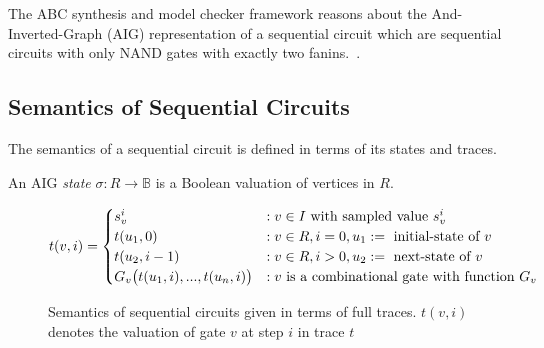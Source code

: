 The ABC synthesis and model checker framework reasons about 
the And-Inverted-Graph (AIG) representation of a sequential 
circuit which are sequential circuits with only NAND gates 
with exactly two fanins.~\cite{brayton2010abc}. 

\subsection{Semantics of Sequential Circuits}
\label{s:back:crct_semantics}
%
The semantics of a sequential circuit is defined in terms of its states and traces.
%
\begin{definition}
An AIG \emph{state} $\sigma: R \rightarrow \mathbb{B}$ is a Boolean valuation of vertices in $R$. 
\end{definition}
%


%
\begin{figure*}
\[
t(v,i)=
   \begin{cases}
      s^i_{v}            &:v \in I \ \text{with sampled value $s_{v}^i$}\\
      t(u_1, 0)       &:v \in R,i=0,u_1:=\ \text{initial-state of $v$}\\
      t(u_2, i-1)        &:v \in R,i>0,u_2:=\ \text{next-state of $v$}\\
      G_v\big(t(u_{1},i),...,t(u_{n},i)\big) &: v \ \text{is a combinational gate with function $G_v$}
   \end{cases} \newline
\]
\caption{Semantics of sequential circuits given in terms of 
  full traces. $t(v,i)$ denotes the valuation of gate $v$ at step $i$ in trace $t$}
\label{fig:gate-value}
\end{figure*}
%


